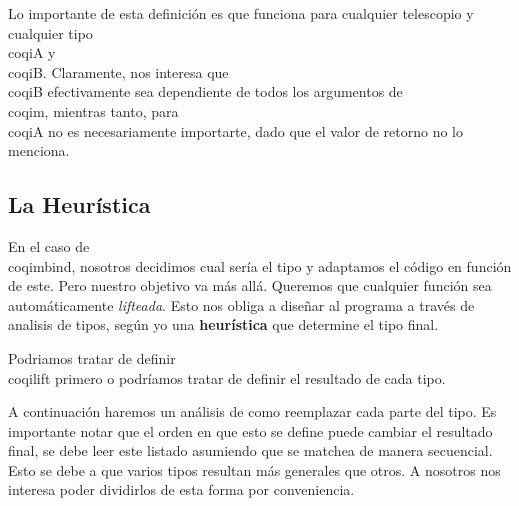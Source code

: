 Lo importante de esta definición es que funciona para cualquier telescopio y
cualquier tipo \\coqi{A} y \\coqi{B}. Claramente, nos interesa que \\coqi{B}
efectivamente sea dependiente de todos los argumentos de \\coqi{m}, mientras
tanto, para \\coqi{A} no es necesariamente importarte, dado que el valor de
retorno no lo menciona.

\subsection{La Heurística}

En el caso de \\coqi{mbind}, nosotros decidimos cual sería el tipo y adaptamos el
código en función de este. Pero nuestro objetivo va más allá. Queremos que
cualquier función sea automáticamente \textit{lifteada}. Esto nos obliga a
diseñar al programa a través de analisis de tipos, según yo una
\textbf{heurística} que determine el tipo final.

Podriamos tratar de definir \\coqi{lift} primero o podríamos tratar de definir el
resultado de cada tipo.

A continuación haremos un análisis de como reemplazar cada parte del tipo. Es
importante notar que el orden en que esto se define puede cambiar el resultado
final, se debe leer este listado asumiendo que se matchea de manera secuencial.
Esto se debe a que varios tipos resultan más generales que otros. A nosotros nos
interesa poder dividirlos de esta forma por conveniencia.

